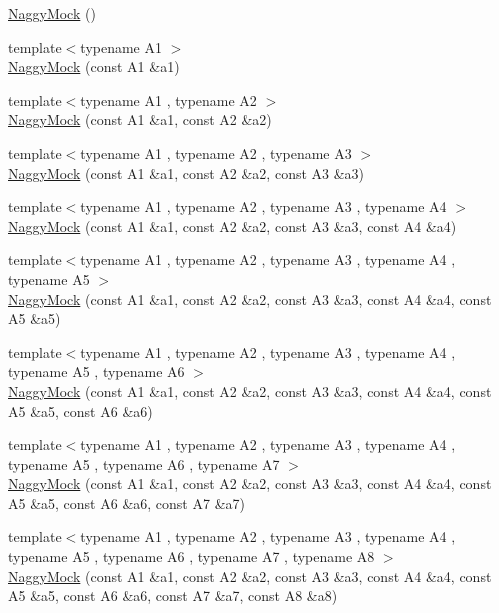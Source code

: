 \begin{DoxyCompactItemize}
\item 
\hyperlink{classtesting_1_1_naggy_mock_acb769f78b93eb60b04db21250f416f70}{Naggy\+Mock} ()
\item 
{\footnotesize template$<$typename A1 $>$ }\\\hyperlink{classtesting_1_1_naggy_mock_ae43ea6c6a6b66fe31cb14f93e0be5718}{Naggy\+Mock} (const A1 \&a1)
\item 
{\footnotesize template$<$typename A1 , typename A2 $>$ }\\\hyperlink{classtesting_1_1_naggy_mock_a4241363ab2ca3a2e7baa5ead980175e6}{Naggy\+Mock} (const A1 \&a1, const A2 \&a2)
\item 
{\footnotesize template$<$typename A1 , typename A2 , typename A3 $>$ }\\\hyperlink{classtesting_1_1_naggy_mock_abd9eea0573bf39f4b41504b2d1df5311}{Naggy\+Mock} (const A1 \&a1, const A2 \&a2, const A3 \&a3)
\item 
{\footnotesize template$<$typename A1 , typename A2 , typename A3 , typename A4 $>$ }\\\hyperlink{classtesting_1_1_naggy_mock_aa7d63f62600171db931c6bbb4c2a6d52}{Naggy\+Mock} (const A1 \&a1, const A2 \&a2, const A3 \&a3, const A4 \&a4)
\item 
{\footnotesize template$<$typename A1 , typename A2 , typename A3 , typename A4 , typename A5 $>$ }\\\hyperlink{classtesting_1_1_naggy_mock_ac751c8a708935bd8558c9665160f7144}{Naggy\+Mock} (const A1 \&a1, const A2 \&a2, const A3 \&a3, const A4 \&a4, const A5 \&a5)
\item 
{\footnotesize template$<$typename A1 , typename A2 , typename A3 , typename A4 , typename A5 , typename A6 $>$ }\\\hyperlink{classtesting_1_1_naggy_mock_aac4c0986e917a5d6e515f8dc0e7bf644}{Naggy\+Mock} (const A1 \&a1, const A2 \&a2, const A3 \&a3, const A4 \&a4, const A5 \&a5, const A6 \&a6)
\item 
{\footnotesize template$<$typename A1 , typename A2 , typename A3 , typename A4 , typename A5 , typename A6 , typename A7 $>$ }\\\hyperlink{classtesting_1_1_naggy_mock_ad1edac1991dd20514e822c90d6896c74}{Naggy\+Mock} (const A1 \&a1, const A2 \&a2, const A3 \&a3, const A4 \&a4, const A5 \&a5, const A6 \&a6, const A7 \&a7)
\item 
{\footnotesize template$<$typename A1 , typename A2 , typename A3 , typename A4 , typename A5 , typename A6 , typename A7 , typename A8 $>$ }\\\hyperlink{classtesting_1_1_naggy_mock_a63b30506f56b792ffbdc5792a9630d5e}{Naggy\+Mock} (const A1 \&a1, const A2 \&a2, const A3 \&a3, const A4 \&a4, const A5 \&a5, const A6 \&a6, const A7 \&a7, const A8 \&a8)

\end{DoxyCompactItemize}
